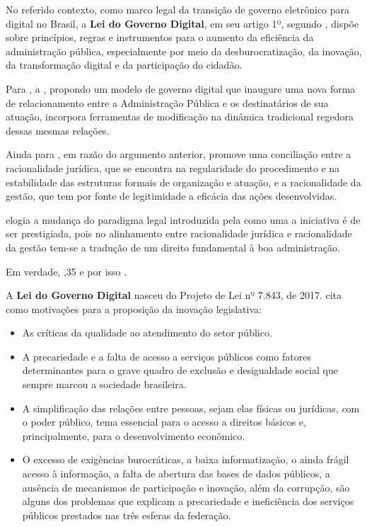 No referido contexto, como marco legal da transição de governo eletrônico para digital  no Brasil, a \textbf{Lei do Governo Digital}, em seu artigo 1º, segundo \cite{l14129},  dispõe sobre princípios, regras e instrumentos para o aumento da eficiência da administração pública, especialmente por meio da desburocratização, da inovação, da transformação digital e da participação do cidadão.

Para \cite{do2022governo}, a , propondo um modelo de governo digital que inaugure uma nova forma de relacionamento entre a Administração Pública e os destinatários de sua atuação, incorpora ferramentas de modificação na dinâmica tradicional regedora dessas mesmas relações.

Ainda para \cite{do2022governo}, em razão do argumento anterior, promove uma conciliação entre a racionalidade jurídica, que se encontra na regularidade do procedimento e na estabilidade das estruturas formais de organização e atuação, e a racionalidade da gestão, que tem por fonte de legitimidade a eficácia das ações desenvolvidas. 

\cite{do2022governo} elogia a mudança do paradigma legal introduzida pela  como uma a iniciativa é de ser prestigiada, pois no alinhamento entre racionalidade jurídica e racionalidade da gestão tem-se a tradução de um direito fundamental à boa administração.

Em verdade, ,35 e por isso .

A \textbf{Lei do Governo Digital} nasceu do Projeto de Lei nº 7.843, de 2017. \cite{pl_lgd} cita como motivações para a proposição da inovação legislativa:

\begin{itemize}
    \item As críticas da qualidade ao atendimento do setor público.
    \item A precariedade e a falta de acesso a serviços públicos como fatores determinantes para o grave quadro de exclusão e desigualdade social que sempre marcou a sociedade brasileira. 
    \item  A simplificação das relações entre pessoas,
    sejam elas físicas ou jurídicas, com o poder público, tema essencial para o acesso a direitos básicos e, principalmente, para o desenvolvimento econômico.
    \item O excesso de exigências burocráticas, a baixa informatização, o ainda frágil acesso à informação, a falta de abertura das bases de dados públicos, a ausência de mecanismos de participação e inovação, além da corrupção, são alguns dos problemas que explicam a precariedade e ineficiência dos serviços públicos prestados
    nas três esferas da federação.
\end{itemize}

